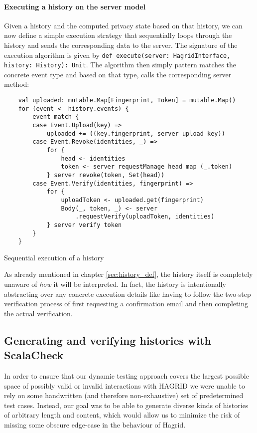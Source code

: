 \paragraph{Executing a history on the server model}
Given a history and the computed privacy state based on that history, we can now define a simple execution strategy that sequentially loops through the history and sends the corresponding data to the server.
The signature of the execution algorithm is given by \texttt{def execute(server: HagridInterface, history: History): Unit}.
The algorithm then simply pattern matches the concrete event type and based on that type, calls the corresponding server method: 
\begin{code}
    \begin{verbatim}
    val uploaded: mutable.Map[Fingerprint, Token] = mutable.Map()
    for (event <- history.events) {
        event match {
        case Event.Upload(key) =>
            uploaded += ((key.fingerprint, server upload key))
        case Event.Revoke(identities, _) =>
            for {
                head <- identities
                token <- server requestManage head map (_.token)
            } server revoke(token, Set(head))
        case Event.Verify(identities, fingerprint) =>
            for {
                uploadToken <- uploaded.get(fingerprint)
                Body(_, token, _) <- server
                    .requestVerify(uploadToken, identities)
            } server verify token
        }
    }
    \end{verbatim}
    \caption{Sequential execution of a history}
\end{code}

As already mentioned in chapter \ref{sec:history_def}, the history itself is completely unaware of \emph{how} it will be interpreted. In fact, the history is intentionally abstracting over any concrete execution details like having to follow the two-step verification process of first requesting a confirmation email and then completing the actual verification.



\subsection{Generating and verifying histories with ScalaCheck}
\label{sec:test_approach}
In order to ensure that our dynamic testing approach covers the largest possible space of possibly valid or invalid interactions with HAGRID we were unable to rely on some handwritten (and therefore non-exhaustive) set of predetermined test cases. Instead, our goal was to be able to generate diverse kinds of histories of arbitrary length and content, which would allow us to minimize the risk of missing some obscure edge-case in the behaviour of Hagrid.

